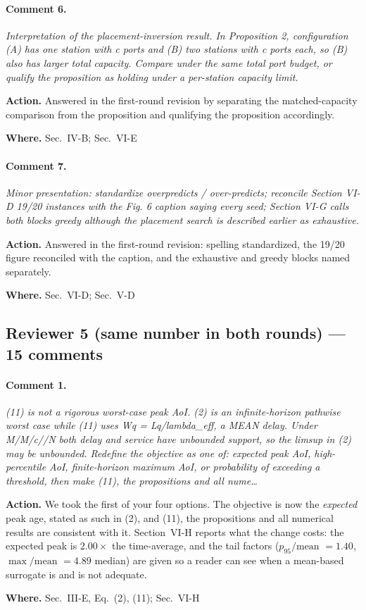 \documentclass[10pt]{article}
\newcommand{\rev}[1]{\par\medskip\noindent\textit{#1}\par\smallskip}
\newcommand{\act}[2]{\noindent\textbf{Action.} #1\par\noindent\textbf{Where.} #2\par}
\begin{document}
\paragraph{Comment 6.}
\rev{Interpretation of the placement-inversion result. In Proposition 2, configuration (A) has one station with c ports and (B) two stations with c ports each, so (B) also has larger total capacity. Compare under the same total port budget, or qualify the proposition as holding under a per-station capacity limit.}
\act{Answered in the first-round revision by separating the matched-capacity comparison from the proposition and qualifying the proposition accordingly.}{Sec.~IV-B; Sec.~VI-E}

\paragraph{Comment 7.}
\rev{Minor presentation: standardize overpredicts / over-predicts; reconcile Section VI-D 19/20 instances with the Fig. 6 caption saying every seed; Section VI-G calls both blocks greedy although the placement search is described earlier as exhaustive.}
\act{Answered in the first-round revision: spelling standardized, the 19/20 figure reconciled with the caption, and the exhaustive and greedy blocks named separately.}{Sec.~VI-D; Sec.~V-D}

\subsection*{Reviewer 5 (same number in both rounds) --- 15 comments}

\paragraph{Comment 1.}
\rev{(11) is not a rigorous worst-case peak AoI. (2) is an infinite-horizon pathwise worst case while (11) uses Wq = Lq/lambda\_eff, a MEAN delay. Under M/M/c//N both delay and service have unbounded support, so the limsup in (2) may be unbounded. Redefine the objective as one of: expected peak AoI, high-percentile AoI, finite-horizon maximum AoI, or probability of exceeding a threshold, then make (11), the propositions and all nume\dots}
\act{We took the first of your four options. The objective is now the \emph{expected} peak age, stated as such in (2), and (11), the propositions and all numerical results are consistent with it. Section~VI-H reports what the change costs: the expected peak is $2.00\times$ the time-average, and the tail factors ($p_{95}/\text{mean}$ $=1.40$, $\max/\text{mean}$ $=4.89$ median) are given so a reader can see when a mean-based surrogate is and is not adequate.}{Sec.~III-E, Eq.~(2), (11); Sec.~VI-H}
\end{document}
